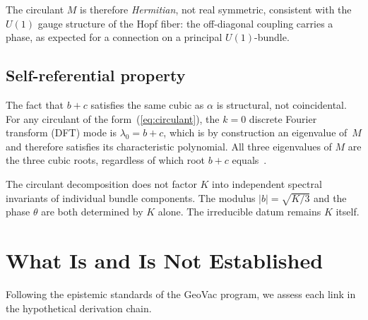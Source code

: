 \documentclass[aps,prl,twocolumn,superscriptaddress]{revtex4-2}
\begin{document}
The circulant $M$ is therefore \textit{Hermitian}, not real symmetric,
consistent with the $U(1)$ gauge structure of the Hopf fiber: the
off-diagonal coupling carries a phase, as expected for a connection on
a principal $U(1)$-bundle.

\subsection{Self-referential property}

The fact that $b + c$ satisfies the same cubic as $\alpha$ is
structural, not coincidental. For any circulant of the
form~(\ref{eq:circulant}), the $k = 0$ discrete Fourier transform (DFT)
mode is $\lambda_0 = b + c$, which is by construction an eigenvalue
of~$M$ and therefore satisfies its characteristic polynomial. All three
eigenvalues of $M$ are the three cubic roots, regardless of which root
$b + c$ equals~\cite{phase3_audit}.

The circulant decomposition does not factor $K$ into independent
spectral invariants of individual bundle components. The modulus
$|b| = \sqrt{K/3}$ and the phase $\theta$ are both determined by $K$
alone. The irreducible datum remains $K$ itself.


\section{What Is and Is Not Established}

Following the epistemic standards of the GeoVac program, we assess
each link in the hypothetical derivation chain.
\end{document}
